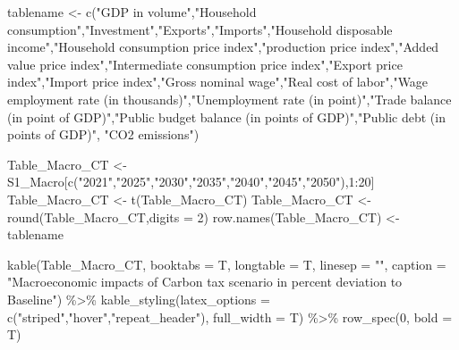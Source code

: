 \documentclass[
]{article}
\newenvironment{Shaded}{\begin{snugshade}}{\end{snugshade}}
\newcommand{\AttributeTok}[1]{\textcolor[rgb]{0.77,0.63,0.00}{#1}}
\newcommand{\DecValTok}[1]{\textcolor[rgb]{0.00,0.00,0.81}{#1}}
\newcommand{\FunctionTok}[1]{\textcolor[rgb]{0.00,0.00,0.00}{#1}}
\newcommand{\NormalTok}[1]{#1}
\newcommand{\OtherTok}[1]{\textcolor[rgb]{0.56,0.35,0.01}{#1}}
\newcommand{\SpecialCharTok}[1]{\textcolor[rgb]{0.00,0.00,0.00}{#1}}
\newcommand{\StringTok}[1]{\textcolor[rgb]{0.31,0.60,0.02}{#1}}
\begin{document}
\begin{Shaded}
\begin{Highlighting}[]
\NormalTok{tablename }\OtherTok{\textless{}{-}} \FunctionTok{c}\NormalTok{(}\StringTok{"GDP in volume"}\NormalTok{,}\StringTok{"Household consumption"}\NormalTok{,}\StringTok{"Investment"}\NormalTok{,}\StringTok{"Exports"}\NormalTok{,}\StringTok{"Imports"}\NormalTok{,}\StringTok{"Household disposable income"}\NormalTok{,}\StringTok{"Household consumption price index"}\NormalTok{,}\StringTok{"production price index"}\NormalTok{,}\StringTok{"Added value price index"}\NormalTok{,}\StringTok{"Intermediate consumption price index"}\NormalTok{,}\StringTok{"Export price index"}\NormalTok{,}\StringTok{"Import price index"}\NormalTok{,}\StringTok{"Gross nominal wage"}\NormalTok{,}\StringTok{"Real cost of labor"}\NormalTok{,}\StringTok{"Wage employment rate (in thousands)"}\NormalTok{,}\StringTok{"Unemployment rate (in point)"}\NormalTok{,}\StringTok{"Trade balance (in point of GDP)"}\NormalTok{,}\StringTok{"Public budget balance (in points of GDP)"}\NormalTok{,}\StringTok{"Public debt (in points of GDP)"}\NormalTok{, }\StringTok{"CO2 emissions"}\NormalTok{)}

\NormalTok{Table\_Macro\_CT }\OtherTok{\textless{}{-}}\NormalTok{ S1\_Macro[}\FunctionTok{c}\NormalTok{(}\StringTok{"2021"}\NormalTok{,}\StringTok{"2025"}\NormalTok{,}\StringTok{"2030"}\NormalTok{,}\StringTok{"2035"}\NormalTok{,}\StringTok{"2040"}\NormalTok{,}\StringTok{"2045"}\NormalTok{,}\StringTok{"2050"}\NormalTok{),}\DecValTok{1}\SpecialCharTok{:}\DecValTok{20}\NormalTok{]}
\NormalTok{Table\_Macro\_CT }\OtherTok{\textless{}{-}} \FunctionTok{t}\NormalTok{(Table\_Macro\_CT)}
\NormalTok{Table\_Macro\_CT }\OtherTok{\textless{}{-}} \FunctionTok{round}\NormalTok{(Table\_Macro\_CT,}\AttributeTok{digits =} \DecValTok{2}\NormalTok{)}
\FunctionTok{row.names}\NormalTok{(Table\_Macro\_CT) }\OtherTok{\textless{}{-}}\NormalTok{ tablename}

\FunctionTok{kable}\NormalTok{(Table\_Macro\_CT, }\AttributeTok{booktabs =}\NormalTok{ T, }\AttributeTok{longtable =}\NormalTok{ T, }\AttributeTok{linesep =} \StringTok{""}\NormalTok{, }\AttributeTok{caption =} \StringTok{"Macroeconomic impacts of Carbon tax scenario in percent deviation to Baseline"}\NormalTok{) }\SpecialCharTok{\%\textgreater{}\%} 
\FunctionTok{kable\_styling}\NormalTok{(}\AttributeTok{latex\_options =} \FunctionTok{c}\NormalTok{(}\StringTok{"striped"}\NormalTok{,}\StringTok{"hover"}\NormalTok{,}\StringTok{"repeat\_header"}\NormalTok{), }\AttributeTok{full\_width =}\NormalTok{ T) }\SpecialCharTok{\%\textgreater{}\%} 
\FunctionTok{row\_spec}\NormalTok{(}\DecValTok{0}\NormalTok{, }\AttributeTok{bold =}\NormalTok{ T)}
\end{Highlighting}
\end{Shaded}
\end{document}
